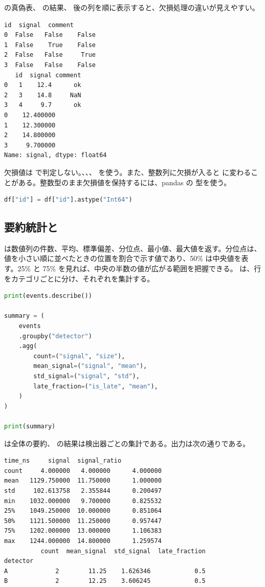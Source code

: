  の真偽表、 の結果、 後の列を順に表示すると、欠損処理の違いが見えやすい。

\begin{lstlisting}[numbers=none, xleftmargin=2\zw]
      id  signal  comment
0  False   False    False
1  False    True    False
2  False   False     True
3  False   False    False
   id  signal comment
0   1    12.4      ok
2   3    14.8     NaN
3   4     9.7      ok
0    12.400000
1    12.300000
2    14.800000
3     9.700000
Name: signal, dtype: float64
\end{lstlisting}

欠損値は \code{==} で判定しない。、、、 を使う。また、整数列に欠損が入ると  に変わることがある。整数型のまま欠損値を保持するには、pandas の  型を使う。

\begin{lstlisting}[language=Python]
df["id"] = df["id"].astype("Int64")
\end{lstlisting}

\subsection{要約統計と }

 は数値列の件数、平均、標準偏差、分位点、最小値、最大値を返す。分位点は、値を小さい順に並べたときの位置を割合で示す値であり、50\% は中央値を表す。25\% と 75\% を見れば、中央の半数の値が広がる範囲を把握できる。 は、行をカテゴリごとに分け、それぞれを集計する。

\begin{lstlisting}[language=Python]
print(events.describe())

summary = (
    events
    .groupby("detector")
    .agg(
        count=("signal", "size"),
        mean_signal=("signal", "mean"),
        std_signal=("signal", "std"),
        late_fraction=("is_late", "mean"),
    )
)

print(summary)
\end{lstlisting}

 は全体の要約、 の結果は検出器ごとの集計である。出力は次の通りである。

\begin{lstlisting}[numbers=none, xleftmargin=2\zw]
           time_ns     signal  signal_ratio
count     4.000000   4.000000      4.000000
mean   1129.750000  11.750000      1.000000
std     102.613758   2.355844      0.200497
min    1032.000000   9.700000      0.825532
25%    1049.250000  10.000000      0.851064
50%    1121.500000  11.250000      0.957447
75%    1202.000000  13.000000      1.106383
max    1244.000000  14.800000      1.259574
          count  mean_signal  std_signal  late_fraction
detector
A             2        11.25    1.626346            0.5
B             2        12.25    3.606245            0.5
\end{lstlisting}

